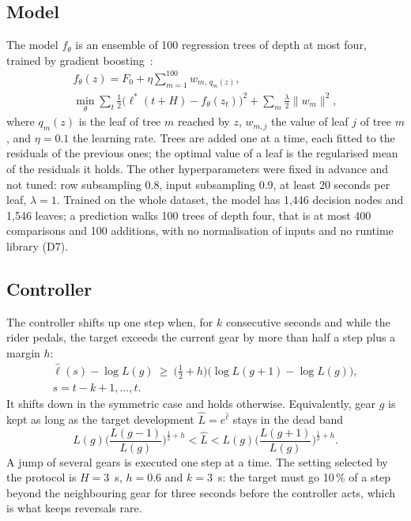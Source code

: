\documentclass[conference]{IEEEtran}
\newcommand{\lhat}{\hat{\ell}}
\newcommand{\pct}{\,\%}
\begin{document}
\subsection{Model}
The model $f_\theta$ is an ensemble of 100 regression trees of depth at most four, trained by gradient boosting~\cite{xgboost}:
\begin{multline}
f_\theta(z) = F_0 + \eta \sum_{m=1}^{100} w_{m,\,q_m(z)},\\
\min_{\theta} \sum_t \tfrac{1}{2}\big(\ell^*(t+H) - f_\theta(z_t)\big)^2 + \sum_m \tfrac{\lambda}{2}\lVert w_m \rVert^2,
\end{multline}
where $q_m(z)$ is the leaf of tree $m$ reached by $z$, $w_{m,j}$ the value of leaf $j$ of tree $m$, and $\eta = 0.1$ the learning rate. Trees are added one at a time, each fitted to the residuals of the previous ones; the optimal value of a leaf is the regularised mean of the residuals it holds. The other hyperparameters were fixed in advance and not tuned: row subsampling 0.8, input subsampling 0.9, at least 20 seconds per leaf, $\lambda = 1$. Trained on the whole dataset, the model has 1,446 decision nodes and 1,546 leaves; a prediction walks 100 trees of depth four, that is at most 400 comparisons and 100 additions, with no normalisation of inputs and no runtime library (D7).

\subsection{Controller}
The controller shifts up one step when, for $k$ consecutive seconds and while the rider pedals, the target exceeds the current gear by more than half a step plus a margin $h$:
\begin{equation}
\begin{split}
\lhat(s) - \log L(g) \ \ge\ \big(\tfrac{1}{2} + h\big)\big(\log L(g+1) - \log L(g)\big),\\
s = t-k+1, \dots, t.
\end{split}
\end{equation}
It shifts down in the symmetric case and holds otherwise. Equivalently, gear $g$ is kept as long as the target development $\hat L = e^{\lhat}$ stays in the dead band
\begin{equation}
L(g)\Big(\frac{L(g-1)}{L(g)}\Big)^{\frac12+h} < \hat L < L(g)\Big(\frac{L(g+1)}{L(g)}\Big)^{\frac12+h}.
\end{equation}
A jump of several gears is executed one step at a time. The setting selected by the protocol is $H = 3$~s, $h = 0.6$ and $k = 3$~s: the target must go 10\pct{} of a step beyond the neighbouring gear for three seconds before the controller acts, which is what keeps reversals rare.
\end{document}
